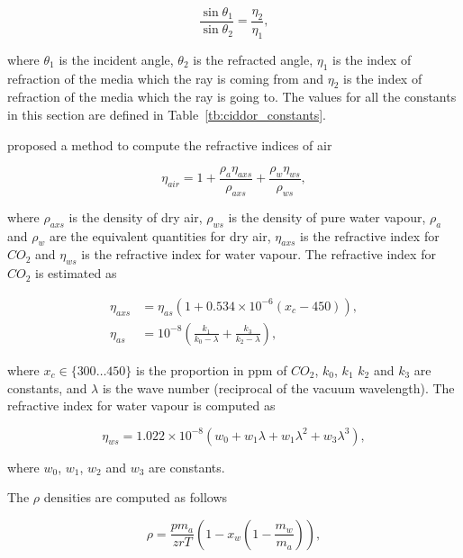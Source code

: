 \begin{equation}
\frac{\sin \theta_1}{\sin \theta_2} = \frac{\eta_2}{\eta_1},
\end{equation}

where $\theta_1$ is the incident angle, $\theta_2$ is the refracted angle, $\eta_1$ is the index of refraction of the media which the ray is coming from and $\eta_2$ is the index of refraction of the media which the ray is going to.
The values for all the constants in this section are defined in Table~\ref{tb:ciddor_constants}.

\cite{Ciddor:1996} proposed a method to compute the refractive indices of air 

\begin{equation}
\label{eq:ciddor_eta_air}
\eta_{air} = 1 + \frac{\rho_a \eta_{axs}}{\rho_{axs}} + \frac{\rho_w \eta_{ws}}{\rho_{ws}},
\end{equation}

where $\rho_{axs}$ is the density of dry air, $\rho_{ws}$ is the density of pure water vapour, $\rho_{a}$ and $\rho_{w}$ are the equivalent quantities for dry air, $\eta_{axs}$ is the refractive index for $CO_2$ and $\eta_{ws}$ is the refractive index for water vapour.
The refractive index for $CO_2$ is estimated as

\begin{align}
\label{eq:ciddor_eta_axs}
\eta_{axs} &= \eta_{as} \left(1 + 0.534 \times 10^{-6} \left(x_c - 450 \right) \right), \\
\label{eq:ciddor_eta_as}
\eta_{as} &= 10^{-8} \left( \frac{k_1}{k_0 - \lambda} + \frac{k_3}{k_2 - \lambda} \right),
\end{align}

where $x_c \in \lbrace 300 \ldots 450 \rbrace $ is the proportion in ppm of $CO_2$, $k_0$, $k_1$ $k_2$ and $k_3$ are constants, and $\lambda$ is the wave number (reciprocal of the vacuum wavelength).
The refractive index for water vapour is computed as

\begin{equation}
\label{eq:ciddor_eta_ws}
\eta_{ws} = 1.022 \times 10^{-8} \left( w_0 + w_1 \lambda + w_1 \lambda^2 + w_3 \lambda^3 \right),
\end{equation}

where $w_0$, $w_1$, $w_2$ and $w_3$ are constants.

The $\rho$ densities are computed as follows

\begin{equation}
\label{eq:ciddor_rho}
\rho =  \frac{p m_a}{zrT} \left( 1 - x_w \left(1 - \frac{m_w}{m_a} \right) \right), 
\end{equation}

